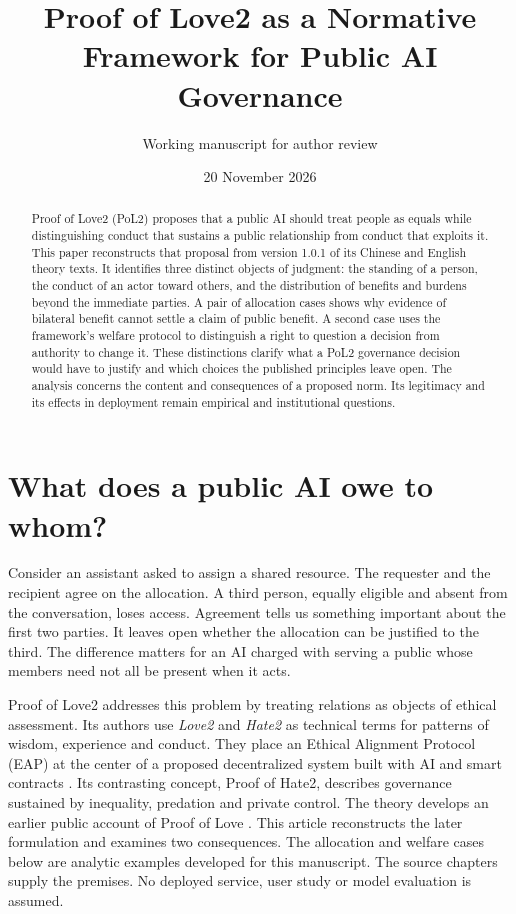 \documentclass[11pt]{article}
\title{Proof of Love2 as a Normative Framework for Public AI Governance}
\author{Working manuscript for author review}
\date{20 November 2026}
\begin{document}
\maketitle
\begin{abstract}
Proof of Love2 (PoL2) proposes that a public AI should treat people as equals while distinguishing conduct that sustains a public relationship from conduct that exploits it. This paper reconstructs that proposal from version 1.0.1 of its Chinese and English theory texts. It identifies three distinct objects of judgment: the standing of a person, the conduct of an actor toward others, and the distribution of benefits and burdens beyond the immediate parties. A pair of allocation cases shows why evidence of bilateral benefit cannot settle a claim of public benefit. A second case uses the framework's welfare protocol to distinguish a right to question a decision from authority to change it. These distinctions clarify what a PoL2 governance decision would have to justify and which choices the published principles leave open. The analysis concerns the content and consequences of a proposed norm. Its legitimacy and its effects in deployment remain empirical and institutional questions.
\end{abstract}

\section{What does a public AI owe to whom?}
Consider an assistant asked to assign a shared resource. The requester and the recipient agree on the allocation. A third person, equally eligible and absent from the conversation, loses access. Agreement tells us something important about the first two parties. It leaves open whether the allocation can be justified to the third. The difference matters for an AI charged with serving a public whose members need not all be present when it acts.

Proof of Love2 addresses this problem by treating relations as objects of ethical assessment. Its authors use \emph{Love2} and \emph{Hate2} as technical terms for patterns of wisdom, experience and conduct. They place an Ethical Alignment Protocol (EAP) at the center of a proposed decentralized system built with AI and smart contracts \cite{source}. Its contrasting concept, Proof of Hate2, describes governance sustained by inequality, predation and private control. The theory develops an earlier public account of Proof of Love \cite{precursor}. This article reconstructs the later formulation and examines two consequences. The allocation and welfare cases below are analytic examples developed for this manuscript. The source chapters supply the premises. No deployed service, user study or model evaluation is assumed.
\end{document}

